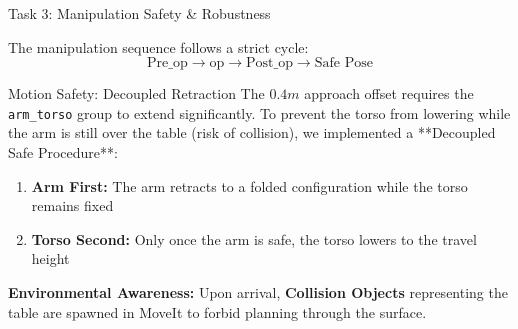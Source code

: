 \begin{frame}{Task 3: Manipulation Safety \& Robustness}

    \begin{center}
        The manipulation sequence follows a strict cycle:
        $$ \text{Pre\_op} \rightarrow \text{op} \rightarrow \text{Post\_op} \rightarrow \text{Safe Pose} $$
    \end{center}
    
    \begin{alertblock}{Motion Safety: Decoupled Retraction}
        The $0.4m$ approach offset requires the \texttt{arm\_torso} group to extend significantly. To prevent the torso from lowering while the arm is still over the table (risk of collision), we implemented a **Decoupled Safe Procedure**:
        \begin{enumerate}
            \item \textbf{Arm First:} The arm retracts to a folded configuration while the torso remains fixed
            \item \textbf{Torso Second:} Only once the arm is safe, the torso lowers to the travel height
        \end{enumerate}
    \end{alertblock}
    \textbf{Environmental Awareness:}
    Upon arrival, \textbf{Collision Objects} representing the table are spawned in MoveIt to forbid planning through the surface.
\end{frame}

